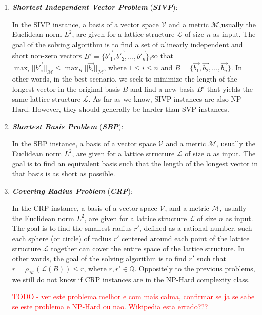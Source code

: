\documentclass[runningheads]{llncs}
\numberwithin{equation}{section}
\begin{document}
\begin{enumerate}
        \vspace{-0.5ex}
        \item \textbf{\textit{Shortest Independent Vector Problem}} (\textbf{\textit{SIVP}}):
        \vspace{0.6ex}

        In the SIVP instance, a basis of a vector space $\mathcal{V}$ and a metric $\mathcal{M}$,\break usually the Euclidean norm ${L}^{2}$, are given for a lattice structure $\mathcal{L}$ of size $n$ as input. The goal of the solving algorithm is to find a set of $n$\break linearly independent and short non-zero vectors $B' = \{ \Vec{{b'}_{1}}, \Vec{{b'}_{2}}, ..., \Vec{{b'}_{n}} \}$,\break so that ${\max}_{i} {||\Vec{{b'}_{i}}||}_{\mathcal{M}} \leq {\max}_{B} {||\Vec{{b}_{i}}||}_{\mathcal{M}}$, where $1 \leq i \leq n$ and $B = \{ \Vec{{b}_{1}}, \Vec{{b}_{2}}, ..., \Vec{{b}_{n}} \}$. In other words, in the best scenario, we seek to minimize the length of the longest vector in the original basis $B$ and find a new basis $B'$ that yields the same lattice structure $\mathcal{L}$. As far as we know, SIVP instances are also NP-Hard. However, they should generally be harder than SVP instances.
        \vspace{2ex}

        \item \textbf{\textit{Shortest Basis Problem}} (\textbf{\textit{SBP}}):
        \vspace{0.6ex}
        
        In the SBP instance, a basis of a vector space $\mathcal{V}$ and a metric $\mathcal{M}$, usually the Euclidean norm ${L}^{2}$, are given for a lattice structure $\mathcal{L}$ of size $n$ as input. The goal is to find an equivalent basis such that the length of the longest vector in that basis is as short as possible.
        \vspace{2ex}

        \item \textbf{\textit{Covering Radius Problem}} (\textbf{\textit{CRP}}):
        \vspace{0.6ex}

        In the CRP instance, a basis of a vector space $\mathcal{V}$, and a metric $\mathcal{M}$, usually the Euclidean norm ${L}^{2}$, are given for a lattice structure $\mathcal{L}$ of size $n$ as input. The goal is to find the smallest radius $r'$, defined as a rational number, such each sphere (or circle) of radius $r'$ centered around each point of the lattice structure $\mathcal{L}$ together can cover the entire space of the lattice structure. In other words, the goal of the solving algorithm is to find $r'$ such that $r = {\rho}_{\mathcal{M}}(\mathcal{L}(B)) \leq r$, where $r, r' \in \mathbb{Q}$. Oppositely to the previous problems, we still do not know if CRP instances are in the NP-Hard complexity class.
        
        \textcolor{red}{TODO - ver este problema melhor e com mais calma, confirmar se ja se sabe se este problema e NP-Hard ou nao. Wikipedia esta errado??? }
        
        
    \end{enumerate}
\end{document}
